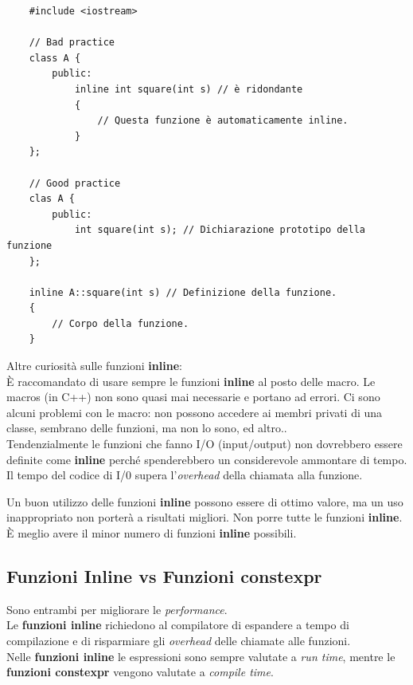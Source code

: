 \begin{lstlisting}
	#include <iostream>
	
	// Bad practice
	class A {
		public:
			inline int square(int s) // è ridondante
			{
				// Questa funzione è automaticamente inline.
			}
	};

	// Good practice
	clas A {
		public:
			int square(int s); // Dichiarazione prototipo della funzione
	};

	inline A::square(int s) // Definizione della funzione.
	{
		// Corpo della funzione.
	}
\end{lstlisting}

\textsf{\small Altre curiosità sulle funzioni \textbf{inline}: } \\

\textsf{\small È raccomandato di usare sempre le funzioni \textbf{inline} al posto delle macro. Le macros (in C++) non sono quasi mai necessarie e portano ad errori. Ci sono alcuni problemi con le macro: non possono accedere ai membri privati di una classe, sembrano delle funzioni, ma non lo sono, ed altro..} \\

\textsf{\small Tendenzialmente le funzioni che fanno I/O (input/output) non dovrebbero essere definite come \textbf{inline} perché spenderebbero un considerevole ammontare di tempo. Il tempo del codice di I/0 supera l'\emph{overhead} della chiamata alla funzione.} \break

\textsf{\small Un buon utilizzo delle funzioni \textbf{inline} possono essere di ottimo valore, ma un uso inappropriato non porterà a risultati migliori. Non porre tutte le funzioni \textbf{inline}. È meglio avere il minor numero di funzioni \textbf{inline} possibili.} \\

\subsection{Funzioni Inline vs Funzioni constexpr}

\textsf{\small Sono entrambi per migliorare le \emph{performance}.} \\

\textsf{\small Le \textbf{funzioni inline} richiedono al compilatore di espandere a tempo di compilazione e di risparmiare gli \emph{overhead} delle chiamate alle funzioni. } \\

\textsf{\small Nelle \textbf{funzioni inline} le espressioni sono sempre valutate a \emph{run time}, mentre le \textbf{funzioni constexpr} vengono valutate a \emph{compile time}.} \\

